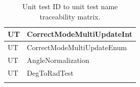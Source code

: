 \documentclass[12pt, titlepage]{article}
\newcounter{unitTest}
\newcommand{\mtheunitTest}{UT\theunitTest}
\begin{document}
{\begin{longtable}{|p{2cm}|p{11cm}|}
    {unitTest} \mtheunitTest \label{CorrectModeMultiUpdateInt} &
    CorrectModeMultiUpdateInt \\ \hline
    {unitTest} \mtheunitTest \label{CorrectModeMultiUpdateEnum} &
    CorrectModeMultiUpdateEnum \\ \hline

    {unitTest} \mtheunitTest \label{AngleNormalization} &
    AngleNormalization \\ \hline
    {unitTest} \mtheunitTest \label{DegToRadTest} & DegToRadTest
    \\ \hline


    \caption{Unit test ID to unit test name traceability matrix.}
    \label{tab:test_id_traceability}
\end{longtable}
}


\end{document}
